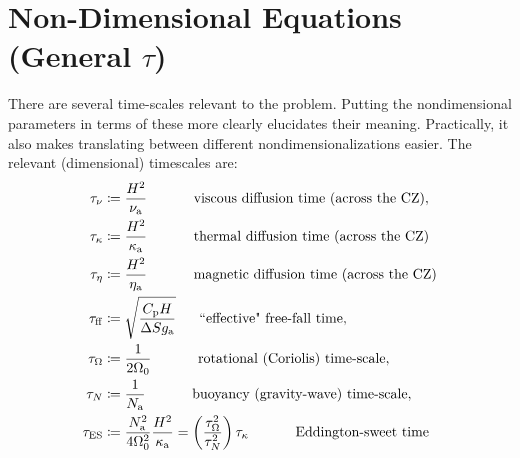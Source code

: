 \documentclass[12pt]{article}
\numberwithin{equation}{section}
\newcommand{\ga}{g_{\rm a}}
\newcommand{\nsqa}{N^2_{\rm a}}
\newcommand{\nua}{\nu_{\rm a}}
\newcommand{\kappaa}{\kappa_{\rm a}}
\newcommand{\etaa}{\eta_{\rm a}}
\begin{document}
	\section{Non-Dimensional Equations (General $\tau$)}\label{sec:eqndgentau}
	There are several time-scales relevant to the problem. Putting the nondimensional parameters in terms of these more clearly elucidates their meaning. Practically, it also makes translating between different nondimensionalizations easier. The relevant (dimensional) timescales are:
	\begin{subequations}\label{eq:timescales}
		\begin{align}
			\taunu &\define \frac{H^2}{\nua}\five\five\text{viscous diffusion time (across the CZ)},\\
			\taukappa &\define \frac{H^2}{\kappaa}\five\five\text{thermal diffusion time (across the CZ)}\\
			\taueta &\define \frac{H^2}{\etaa}\five\five\text{magnetic diffusion time (across the CZ)}\\
			\tauff &\define \sqrt{\frac{\cpcap H}{\Delta S \ga}}\five\text{``effective" free-fall time},\\
			\tauomega &\define \frac{1}{2\omnought}\five\five\text{rotational (Coriolis) time-scale},\\
			\taun &\define \frac{1}{N_{\rm a}}\five\five\text{buoyancy (gravity-wave) time-scale},\\
			\taues &\define \frac{\nsqa}{4\omnought^2}\frac{H^2}{\kappaa}=\left(\frac{\tauomega^2}{\taun^2}\right)\taukappa\five\five\text{Eddington-sweet time}
		\end{align}
	\end{subequations}
	
\end{document}
